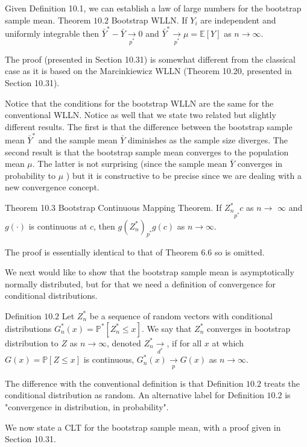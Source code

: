 \documentclass[10pt]{article}
\begin{document}
Given Definition 10.1, we can establish a law of large numbers for the bootstrap sample mean. Theorem $10.2$ Bootstrap WLLN. If $Y_{i}$ are independent and uniformly integrable then $\bar{Y}^{*}-\bar{Y} \underset{p^{*}}{\longrightarrow} 0$ and $\bar{Y}^{*} \underset{p^{*}}{\longrightarrow} \mu=\mathbb{E}[Y]$ as $n \rightarrow \infty$.

The proof (presented in Section 10.31) is somewhat different from the classical case as it is based on the Marcinkiewicz WLLN (Theorem 10.20, presented in Section 10.31).

Notice that the conditions for the bootstrap WLLN are the same for the conventional WLLN. Notice as well that we state two related but slightly different results. The first is that the difference between the bootstrap sample mean $\bar{Y}^{*}$ and the sample mean $\bar{Y}$ diminishes as the sample size diverges. The second result is that the bootstrap sample mean converges to the population mean $\mu$. The latter is not surprising (since the sample mean $\bar{Y}$ converges in probability to $\mu$ ) but it is constructive to be precise since we are dealing with a new convergence concept.

Theorem 10.3 Bootstrap Continuous Mapping Theorem. If $Z_{n}^{*} \underset{p^{*}}{ } c$ as $n \rightarrow$ $\infty$ and $g(\cdot)$ is continuous at $c$, then $g\left(Z_{n}^{*}\right) \underset{p^{*}}{ } g(c)$ as $n \rightarrow \infty$.

The proof is essentially identical to that of Theorem $6.6$ so is omitted.

We next would like to show that the bootstrap sample mean is asymptotically normally distributed, but for that we need a definition of convergence for conditional distributions.

Definition $10.2$ Let $Z_{n}^{*}$ be a sequence of random vectors with conditional distributions $G_{n}^{*}(x)=\mathbb{P}^{*}\left[Z_{n}^{*} \leq x\right]$. We say that $Z_{n}^{*}$ converges in bootstrap distribution to $Z$ as $n \rightarrow \infty$, denoted $Z_{n}^{*} \underset{d^{*}}{\longrightarrow}$, if for all $x$ at which $G(x)=\mathbb{P}[Z \leq x]$ is continuous, $G_{n}^{*}(x) \underset{p}{\longrightarrow} G(x)$ as $n \rightarrow \infty$.

The difference with the conventional definition is that Definition $10.2$ treats the conditional distribution as random. An alternative label for Definition $10.2$ is "convergence in distribution, in probability".

We now state a CLT for the bootstrap sample mean, with a proof given in Section 10.31.
\end{document}
